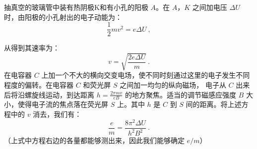 抽真空的玻璃管中装有热阴极K和有小孔的阳极 $A$。在 $A$，$K$ 之间加电压 $\Delta U$ 时，由阳极的小孔射出的电子动能为：
\begin{equation}
\frac{1}{2}mv^2=e\Delta U~,
\end{equation}

从得到其速率为：
\begin{equation}
v=\sqrt{\frac{2e\Delta U}{m}}~.
\end{equation}
在电容器 $C$ 上加一个不大的横向交变电场，使不同时刻通过这里的电子发生不同程度的偏转。在电容器 $C$ 和荧光屏 $S$ 之间加一均匀的纵向磁场， 电子从 $C$ 出来后将沿螺旋线运动，到达距离 $h=\frac{2\pi mv}{eB}$ 的地方聚焦。适当的调节磁感应强度 $B$ 大小，使得电子流的焦点落在荧光屏 $S$ 上。其中 $h$ 是 $C$ 到 $S$ 间的距离。将上述方程中的 $v$ 消去，我们有：
\begin{equation}
\frac {e}{m}=\frac{8\pi ^2 \Delta U}{h^2 B^2}~.
\end{equation}
（上式中方程右边的各量都能够测出来，因此我们能够确定 $e/m$）
